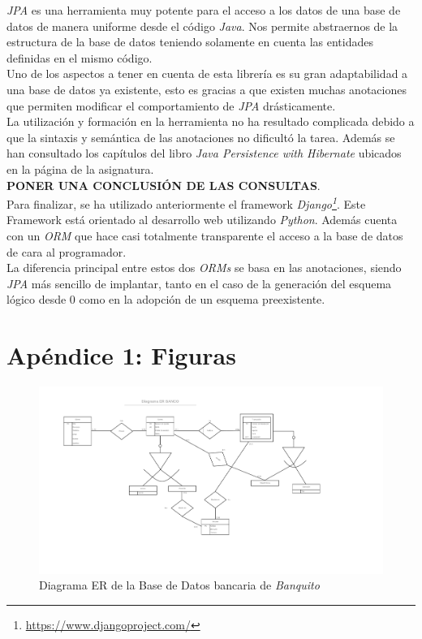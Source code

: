 \documentclass[11pt,a4paper]{article}
\begin{document}
\emph{JPA} es una herramienta muy potente para el acceso a los datos de una base de datos de manera uniforme desde el código \emph{Java}. Nos permite abstraernos de la estructura de la base de datos teniendo solamente en cuenta las entidades definidas en el mismo código.\\
Uno de los aspectos a tener en cuenta de esta librería es su gran adaptabilidad a una base de datos ya existente, esto es gracias a que existen muchas anotaciones que permiten modificar el comportamiento de \emph{JPA} drásticamente.\\

La utilización y formación en la herramienta no ha resultado complicada debido a que la sintaxis y semántica de las anotaciones no dificultó la tarea. Además se han consultado los capítulos del libro \emph{Java Persistence with Hibernate} ubicados en la página de la asignatura.\\

\textbf{PONER UNA CONCLUSIÓN DE LAS CONSULTAS}.\\

Para finalizar, se ha utilizado anteriormente el framework \emph{Django\footnote{\url{https://www.djangoproject.com/}}}. Este Framework está orientado al desarrollo web utilizando \emph{Python}. Además cuenta con un \emph{ORM} que hace casi totalmente transparente el acceso a la base de datos de cara al programador.\\
La diferencia principal entre estos dos \emph{ORMs} se basa en las anotaciones, siendo \emph{JPA} más sencillo de implantar, tanto en el caso de la generación del esquema lógico desde 0 como en la adopción de un esquema preexistente.

\newpage
\section{Apéndice 1: Figuras}

\begin{landscape}
\begin{figure}
\centering
\includegraphics[scale=0.75]{images/diagramaer.png}
\caption{Diagrama ER de la Base de Datos bancaria de \emph{Banquito}}
\label{fig:diagramaer}
\end{figure}
\end{landscape}
\end{document}
